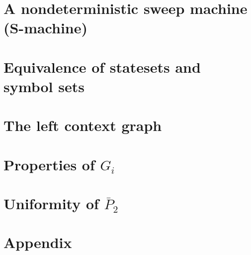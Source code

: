 \documentclass{article}
\begin{document}
\section{A nondeterministic sweep machine (S-machine)}\label{sec:s_machine_definition}


\section{Equivalence of statesets and symbol sets}\label{sec:two}
\section{The left context graph}\label{sec:three}
\section{Properties of $G_i$}\label{sec:four}
\section{Uniformity of $\bar{P}_2$}\label{sec:five}
\section{Appendix}\label{sec:appendix}

\end{document}
